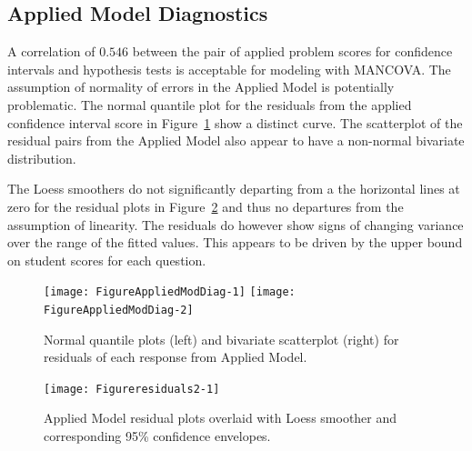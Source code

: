 \documentclass[11pt]{isuthesis}\usepackage[]{graphicx}\usepackage[]{color}
\newenvironment{knitrout}{}{} %
\begin{document}
\begin{appendices}
\begin{knitrout}
\end{knitrout}

\subsection{Applied Model Diagnostics}
\label{appAppliedModDiag}

A correlation of $0.546$ between the pair of applied problem scores for confidence intervals and hypothesis tests is acceptable for modeling with MANCOVA.  The assumption of normality of errors in the Applied Model is potentially problematic. The normal quantile plot for the residuals from the applied confidence interval score in Figure~\ref{fig:AppliedModDiag} show a distinct curve. The scatterplot of the residual pairs from the Applied Model also appear to have a non-normal bivariate distribution.

The Loess smoothers do not significantly departing from a the horizontal lines at zero for the residual plots in Figure~\ref{fig:residuals2} and thus no departures from the assumption of linearity.  The residuals do however show signs of changing variance over the range of the fitted values. This appears to be driven by the upper bound on student scores for each question.

\begin{knitrout}
\color{fgcolor}\begin{figure}[h]

{\centering \texttt{[image: FigureAppliedModDiag-1]} 
\texttt{[image: FigureAppliedModDiag-2]} 

}

\caption[Normal quantile plots (left) and bivariate scatterplot (right) for residuals of each response from Applied Model]{Normal quantile plots (left) and bivariate scatterplot (right) for residuals of each response from Applied Model.}\label{fig:AppliedModDiag}
\end{figure}


\end{knitrout}


\begin{knitrout}
\color{fgcolor}\begin{figure}[H]

{\centering \texttt{[image: Figureresiduals2-1]} 

}

\caption[Applied Model residual plots overlaid with Loess smoother and corresponding 95\% confidence envelopes]{Applied Model residual plots overlaid with Loess smoother and corresponding 95\% confidence envelopes.}\label{fig:residuals2}
\end{figure}



\end{knitrout}
\end{appendices}
\end{document}
